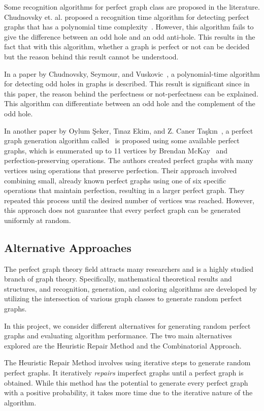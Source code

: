 Some recognition algorithms for perfect graph class are proposed in the literature. Chudnovsky et. al. proposed a recognition time algorithm for detecting perfect graphs that has a polynomial time complexity~\cite{berge-graph}. However, this algorithm fails to give the difference between an odd hole and an odd anti-hole. This results in the fact that with this algorithm, whether a graph is perfect or not can be decided but the reason behind this result cannot be understood.

In a paper by Chudnovsky, Seymour, and Vuskovic~\cite{odd-hole}, a polynomial-time algorithm for detecting odd holes in graphs is described. This result is significant since in this paper, the reason behind the perfectness or not-perfectness can be explained. This algorithm can differentiate between an odd hole and the complement of the odd hole.

In another paper by Oylum Şeker, Tınaz Ekim, and Z. Caner Taşkın~\cite{tinaz}, a perfect graph generation algorithm called \PerfectGen\ is proposed using some available perfect graphs, which is enumerated up to 11 vertices by Brendan McKay~\cite{mckay} and perfection-preserving operations. The authors created perfect graphs with many vertices using operations that preserve perfection. Their approach involved combining small, already known perfect graphs using one of six specific operations that maintain perfection, resulting in a larger perfect graph. They repeated this process until the desired number of vertices was reached. However, this approach does not guarantee that every perfect graph can be generated uniformly at random.

\subsection{Alternative Approaches}

The perfect graph theory field attracts many researchers and is a highly studied branch of graph theory. Specifically, mathematical theoretical results and structures, and recognition, generation, and coloring algorithms are developed by utilizing the intersection of various graph classes to generate random perfect graphs.

In this project, we consider different alternatives for generating random perfect graphs and evaluating algorithm performance. The two main alternatives explored are the Heuristic Repair Method and the Combinatorial Approach.

The Heuristic Repair Method involves using iterative steps to generate random perfect graphs. It iteratively \textit{repairs} imperfect graphs until a perfect graph is obtained. While this method has the potential to generate every perfect graph with a positive probability, it takes more time due to the iterative nature of the algorithm.

